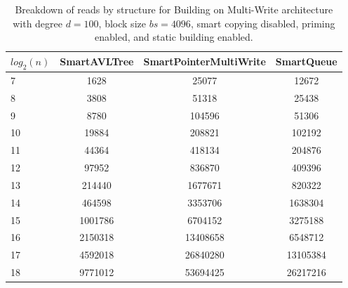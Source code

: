 \begin{table}[]
\centering
\begin{tabular}{|l|c|c|c|}
$log_2(n)$ & SmartAVLTree & SmartPointerMultiWrite & SmartQueue \\ \hline
7 & 1628 & 25077 & 12672 \\ \hline
8 & 3808 & 51318 & 25438 \\ \hline
9 & 8780 & 104596 & 51306 \\ \hline
10 & 19884 & 208821 & 102192 \\ \hline
11 & 44364 & 418134 & 204876 \\ \hline
12 & 97952 & 836870 & 409396 \\ \hline
13 & 214440 & 1677671 & 820322 \\ \hline
14 & 464598 & 3353706 & 1638304 \\ \hline
15 & 1001786 & 6704152 & 3275188 \\ \hline
16 & 2150318 & 13408658 & 6548712 \\ \hline
17 & 4592018 & 26840280 & 13105384 \\ \hline
18 & 9771012 & 53694425 & 26217216 \\ \hline
\end{tabular}
\caption{Breakdown of reads by structure for Building on Multi-Write architecture with degree $d=100$, block size $bs=4096$, smart copying disabled, priming enabled, and static building enabled.}
    \label{tab:reads_by_structure_build_d100_bs4096_copiesfalse_primetrue_staticinsertiontrue_ptmultiwrite_movetrue}
\end{table}

